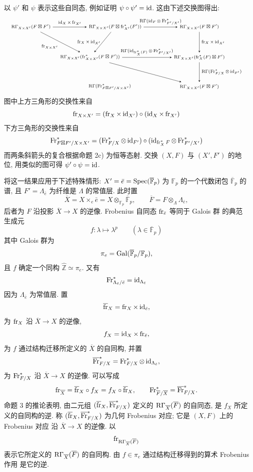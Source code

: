以 $\psi'$ 和 $\psi$ 表示这些自同态, 例如证明 $\psi\circ\psi'=\operatorname{id}$. 这由下述交换图得出:
\[
\resizebox{\textwidth}{!}{%
\begin{tikzpicture}[baseline=(current bounding box.center),>=stealth,font=\scriptsize]
\node (A) at (0,3.6) {$\RGamma_{X\times X'}(F\boxt F')$};
\node (B) at (4.7,3.6) {$\RGamma_{X\times X'}(F\boxt\fr_{X'}^*(F'))$};
\node (C) at (9.4,3.6) {$\RGamma_{X\times X'}(F\boxt F')$};
\node (D) at (3.3,1.9) {$\RGamma_{X\times X'}(\fr^*_{X\times X'}(F\boxt F'))$};
\node (E) at (9.4,1.9) {$\RGamma_{X\times X'}(\fr_X^*(F)\boxt F')$};
\node (F) at (4.4,0.25) {$\RGamma(\Fr^*_{F\boxt F'/X\times X'})$};
\node (G) at (9.4,0.25) {$\RGamma_{X\times X'}(F\boxt F')$};
\draw[->] (A) -- node[above] {$\id_X\times\fr_{X'}$} (B);
\draw[->] (B) -- node[above] {$\RGamma(\id_F\otimes\Fr^*_{F'/X'})$} (C);
\draw[->] (A) -- node[below left] {$\fr_{X\times X'}$} (D);
\draw[->] (B) -- node[left] {$\fr_X\times\id_{X'}$} (D);
\draw[->] (C) -- node[right] {$\fr_X\times\id_{X'}$} (E);
\draw[->] (D) -- node[above] {$\RGamma(\id_{\fr_X^*(F)}\otimes\Fr^*_{F'/X'})$} (E);
\draw[->] (E) -- node[right] {$\RGamma(\Fr^*_{F/X}\otimes\id_{F'})$} (G);
\draw[->] (D) -- (G);
\end{tikzpicture}%
}
\]
图中上方三角形的交换性来自
\[
\operatorname{fr}_{X\times X'}=(\operatorname{fr}_X\times\operatorname{id}_{X'})\circ(\operatorname{id}_X\times\operatorname{fr}_{X'})
\]
下方三角形的交换性来自
\[
\operatorname{Fr}^*_{F\boxtimes F'/X\times X'}=(\operatorname{Fr}^*_{F/X}\otimes\operatorname{id}_{F'})\circ(\operatorname{id}_{\operatorname{fr}_X^*F}\otimes\operatorname{Fr}^*_{F'/X'})
\]
而两条斜箭头的复合根据命题 2c) 为恒等态射. 交换 $(X,F)$ 与 $(X',F')$ 的地位, 用类似的图可得 $\psi'\circ\psi=\operatorname{id}$.

将这一结果应用于下述特殊情形:
$X'=\bar e=\operatorname{Spec}(\overline{\mathbb F}_p)$ 为
$\mathbb F_p$ 的一个代数闭包 $\overline{\mathbb F}_p$ 的谱, 且
$F'=\Lambda_{\bar e}$ 为纤维是 $\Lambda$ 的常值层.
此时置
\[
\overline X=X\times_e\bar e
=X\otimes_{\mathbb F_p}\overline{\mathbb F}_p,
\qquad
\overline F=F\otimes_\Lambda\Lambda_{\bar e},
\]
后者为 $F$ 沿投影 $\overline X\to X$ 的逆像.
Frobenius 自同态 $\operatorname{fr}_{\bar e}$ 等同于 Galois 群
的典范生成元
\[
f:\lambda\longmapsto\lambda^p
\qquad(\lambda\in\overline{\mathbb F}_p)
\]
其中 Galois 群为
\[
\pi_e=\operatorname{Gal}(\overline{\mathbb F}_p/\mathbb F_p),
\]
且 $f$ 确定一个同构
$\widehat{\mathbb Z}\simeq\pi_e$. 又有
\[
\operatorname{Fr}^*_{\Lambda_{\bar e}/\bar e}=\operatorname{id}_{\Lambda_{\bar e}}
\]
因为 $\Lambda_{\bar e}$ 为常值层. 置
\[
\overline{\operatorname{fr}}_X=\operatorname{fr}_X\times\operatorname{id}_{\bar e},
\]
为 $\operatorname{fr}_X$ 沿 $\overline X\to X$ 的逆像,
\[
f_X=\operatorname{id}_X\times\operatorname{fr}_{\bar e},
\]
为 $f$ 通过结构迁移所定义的 $\overline X$ 的自同构,
并置
\[
\overline{\operatorname{Fr}}^*_{F/X}
=\operatorname{Fr}^*_{F/X}\otimes\operatorname{id}_{\Lambda_{\bar e}},
\]
为 $\operatorname{Fr}^*_{F/X}$ 沿 $\overline X\to X$ 的逆像. 可以写成
\[
\operatorname{fr}_{\overline X}
=\overline{\operatorname{fr}}_X\circ f_X
=f_X\circ\overline{\operatorname{fr}}_X,
\qquad
\operatorname{Fr}^*_{\overline F/\overline X}
=\overline{\operatorname{Fr}}^*_{F/X}.
\]
命题 3 的推论表明, 由二元组
$(\overline{\operatorname{fr}}_X,\overline{\operatorname{Fr}}^*_{F/X})$ 定义的
$\mathrm R\Gamma_{\overline X}(\overline F)$ 的自同态, 是
$f_X$ 所定义的自同构的逆. 称
$(\overline{\operatorname{fr}}_X,\overline{\operatorname{Fr}}^*_{F/X})$ 为几何
Frobenius 对应; 它是 $(X,F)$ 上的 Frobenius 对应
沿 $\overline X\to X$ 的逆像. 以
\[
\operatorname{fr}_{\mathrm R\Gamma_{\overline X}(\overline F)}
\]
表示它所定义的 $\mathrm R\Gamma_{\overline X}(\overline F)$ 的自同构.
由 $f\in\pi_e$ 通过结构迁移得到的算术 Frobenius 作用
是它的逆.

